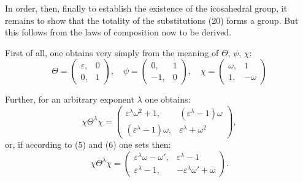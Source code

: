 In order, then, finally to establish the existence of the icosahedral group, it remains to show that the totality of the substitutions (20) forms a group. But this follows from the laws of composition now to be derived.

First of all, one obtains very simply from the meaning of $\Theta$, $\psi$, $\chi$:
\[
\Theta = \begin{pmatrix} \varepsilon, & 0 \\ 0, & 1 \end{pmatrix}, \quad
\psi = \begin{pmatrix} 0, & 1 \\ -1, & 0 \end{pmatrix}, \quad
\chi = \begin{pmatrix} \omega, & 1 \\ 1, & -\omega \end{pmatrix}
\]

Further, for an arbitrary exponent $\lambda$ one obtains:
\[
\chi\Theta^\lambda\chi = \begin{pmatrix} \varepsilon^\lambda\omega^2+1, & (\varepsilon^\lambda-1)\omega \\ (\varepsilon^\lambda-1)\omega, & \varepsilon^\lambda+\omega^2 \end{pmatrix},
\]
or, if according to (5) and (6) one sets
then:
\[
\chi\Theta^\lambda\chi = \begin{pmatrix} \varepsilon^\lambda\omega-\omega', & \varepsilon^\lambda-1 \\ \varepsilon^\lambda-1, & -\varepsilon^\lambda\omega'+\omega \end{pmatrix}.
\]

